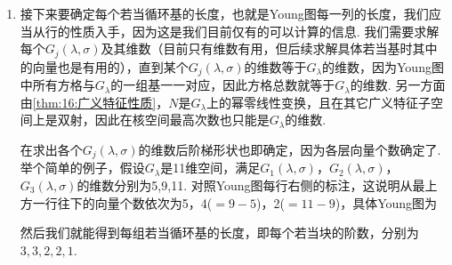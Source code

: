 \begin{enumerate}
    \item 接下来要确定每个若当循环基的长度，也就是Young图每一列的长度，我们应当从行的性质入手，因为这是我们目前仅有的可以计算的信息. 我们需要求解每个$G_j(\lambda,\sigma)$及其维数（目前只有维数有用，但后续求解具体若当基时其中的向量也是有用的），直到某个$G_j(\lambda,\sigma)$的维数等于$G_\lambda$的维数，因为Young图中所有方格与$G_\lambda$的一组基一一对应，因此方格总数就等于$G_\lambda$的维数. 另一方面由\autoref{thm:16:广义特征性质}，$N$是$G_\lambda$上的幂零线性变换，且在其它广义特征子空间上是双射，因此在核空间最高次数也只能是$G_\lambda$的维数.

    在求出各个$G_j(\lambda,\sigma)$的维数后阶梯形状也即确定，因为各层向量个数确定了. 举个简单的例子，假设$G_\lambda$是11维空间，满足$G_1(\lambda,\sigma)$，$G_2(\lambda,\sigma)$，$G_3(\lambda,\sigma)$的维数分别为5,9,11. 对照Young图每行右侧的标注，这说明从最上方一行往下的向量个数依次为5，4($=9-5$)，2($=11-9$)，具体Young图为
    \begin{figure}[H]
        \centering
    \end{figure}
    然后我们就能得到每组若当循环基的长度，即每个若当块的阶数，分别为$3,3,2,2,1$.
\end{enumerate}

